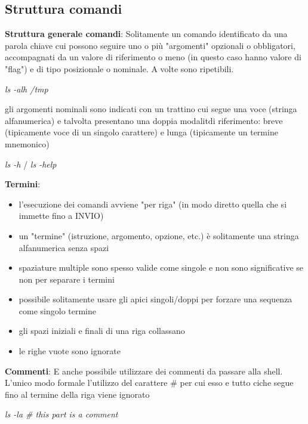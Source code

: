 \subsection{Struttura comandi}
\begin{flushleft}
  \textbf{Struttura generale comandi}: Solitamente un comando \ace identificato da una parola chiave cui possono seguire uno o 
    più "argomenti" opzionali o obbligatori, accompagnati da un valore di riferimento o 
    meno (in questo caso hanno valore di "flag") e di tipo posizionale o nominale. A volte 
    sono ripetibili. \par
    \begin{center}
      \textit{ls -alh /tmp} 
    \end{center}
    gli argomenti nominali sono indicati con un trattino cui segue una voce (stringa 
    alfanumerica) e talvolta presentano una doppia modalit\aca di riferimento: breve 
    (tipicamente voce di un singolo carattere) e lunga (tipicamente un termine mnemonico)
    \begin{flushleft}
      \textit{ls -h} / \textit{ls -help}
    \end{flushleft}
\end{flushleft}
\begin{flushleft}
  \textbf{Termini}:
  \begin{itemize}
    \item l'esecuzione dei comandi avviene "per riga" (in modo diretto quella che si immette fino a INVIO)
    \item un "termine" (istruzione, argomento, opzione, etc.) è solitamente una stringa alfanumerica senza spazi
    \item spaziature multiple sono spesso valide come singole e non sono significative se non per separare i termini 
    \item \ace possibile solitamente usare gli apici singoli/doppi per forzare una sequenza come singolo termine
    \item gli spazi iniziali e finali di una riga collassano 
    \item le righe vuote sono ignorate
  \end{itemize}
\end{flushleft}
\begin{flushleft}
  \textbf{Commenti}: \ac{E} anche possibile utilizzare dei commenti da passare alla shell. L'unico modo formale 
  \ace l'utilizzo del carattere \# per cui esso e tutto ci\aco che segue fino al termine della riga viene ignorato
  \begin{flushleft}
    \textit{ls -la \# this part is a comment}
  \end{flushleft} 
\end{flushleft}
